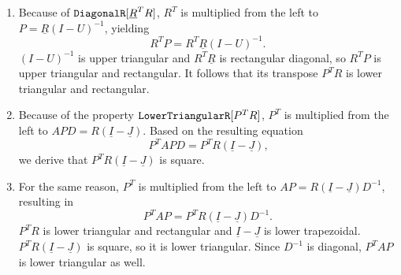 \begin{enumerate}
\item Because of $\text{\ttfamily DiagonalR}[\underline{R}^T R]$, $R^T$ is multiplied from the left to $P = \underline{R} \left( I - U \right)^{-1}$, yielding
%
$$R^T P = R^T \underline{R} \left( I - U \right)^{-1}\text{.}$$
%
$\left( I - U \right)^{-1}$ is upper triangular and $R^T \underline{R}$ is rectangular diagonal, so $R^T P$ is upper triangular and rectangular. It follows that its transpose $P^T R$ is lower triangular and rectangular.
%
\item Because of the property $\text{\ttfamily LowerTriangularR}[P^T R]$, $P^T$ is multiplied from the left to $AP D = R \left( \underline{I} - \underline{J}  \right)$. Based on the resulting equation
%
$$P^T A P D = P^T R \left( \underline{I} - \underline{J}  \right)\text{,}$$
%
we derive that $P^T R \left( \underline{I} - \underline{J}  \right)$ is square.
%
\item For the same reason, $P^T$ is multiplied from the left to $AP = R \left( \underline{I} - \underline{J}  \right)D^{-1}$, resulting in
%
$$P^T A P = P^T R \left( \underline{I} - \underline{J}  \right)D^{-1}\text{.}$$
%
$P^T R$ is lower triangular and rectangular and $\underline{I} - \underline{J}$ is lower trapezoidal. $P^T R \left( \underline{I} - \underline{J}  \right)$ is square, so it is lower triangular. Since $D^{-1}$ is diagonal, $P^T A P$ is lower triangular as well. 
\end{enumerate}

